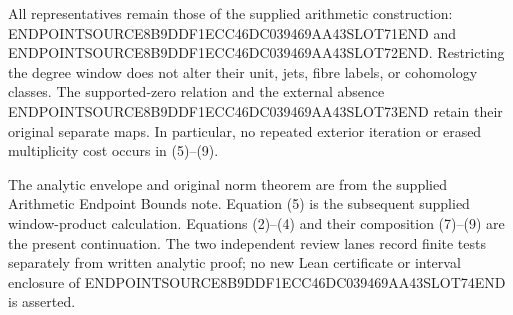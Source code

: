 All representatives remain those of the supplied arithmetic construction: ENDPOINTSOURCE8B9DDF1ECC46DC039469AA43SLOT71END and ENDPOINTSOURCE8B9DDF1ECC46DC039469AA43SLOT72END. Restricting the degree window does not alter their unit, jets, fibre labels, or cohomology classes. The supported-zero relation and the external absence ENDPOINTSOURCE8B9DDF1ECC46DC039469AA43SLOT73END retain their original separate maps. In particular, no repeated exterior iteration or erased multiplicity cost occurs in (5)--(9).

The analytic envelope and original norm theorem are from the supplied Arithmetic Endpoint Bounds note. Equation (5) is the subsequent supplied window-product calculation. Equations (2)--(4) and their composition (7)--(9) are the present continuation. The two independent review lanes record finite tests separately from written analytic proof; no new Lean certificate or interval enclosure of ENDPOINTSOURCE8B9DDF1ECC46DC039469AA43SLOT74END is asserted.
